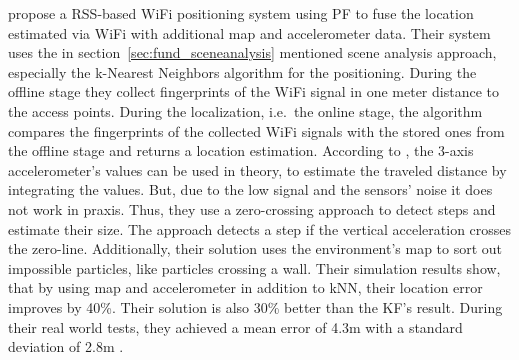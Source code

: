 \citet{wang:wlan} propose a \ac{RSS}-based WiFi positioning system using \ac{PF} to fuse the location estimated via WiFi with additional map and accelerometer data. Their system uses the in section~\ref{sec:fund_sceneanalysis} mentioned scene analysis approach, especially the k-Nearest Neighbors algorithm for the positioning. During the offline stage they collect fingerprints of the WiFi signal in one meter distance to the access points. During the localization, i.e.\ the online stage, the algorithm compares the fingerprints of the collected WiFi signals with the stored ones from the offline stage and returns a location estimation. According to \citet{wang:wlan}, the 3-axis accelerometer's values can be used in theory, to estimate the traveled distance by integrating the values. But, due to the low signal and the sensors' noise it does not work in praxis. Thus, they use a zero-crossing approach to detect steps and estimate their size. The approach detects a step if the vertical acceleration crosses the zero-line. Additionally, their solution uses the environment's map to sort out impossible particles, like particles crossing a wall.
Their simulation results show, that by using map and accelerometer in addition to kNN, their location error improves by 40\%. Their solution is also 30\% better than the \ac{KF}'s result. During their real world tests, they achieved a mean error of 4.3m with a standard deviation of 2.8m \citep{wang:wlan}.

